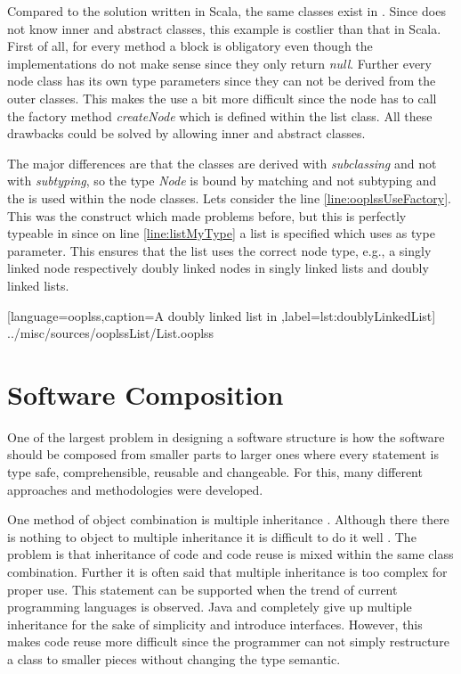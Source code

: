 Compared to the solution written in Scala, the same classes exist
in \ooplss. Since \ooplss does not know inner and abstract classes,
this example is costlier than that in Scala. First of all, for every method 
a block is obligatory even though the implementations do not make sense since
they only return \emph{null}. Further every node class has its own type
parameters since they can not be derived from the outer classes. This
makes the use a bit more difficult since the node has to call the factory
method \emph{createNode} which is defined within the list class. All
these drawbacks could be solved by allowing inner and abstract classes.

The major differences are that the classes are derived with
\emph{subclassing} and not with \emph{subtyping}, so the type
\emph{Node} is bound by matching and not subtyping and the
\mytype is used within the node classes. Lets consider the line
\ref{line:ooplssUseFactory}. This was the construct which made problems
before, but this is perfectly typeable in \ooplss since on
line \ref{line:listMyType} a list is specified which uses \mytype as
type parameter. This ensures that the list uses the correct node type,
e.g., a singly linked node respectively doubly linked nodes in singly
linked lists and doubly linked lists.


[language=ooplss,caption=A doubly linked list in \ooplss,label=lst:doublyLinkedList]
{../misc/sources/ooplssList/List.ooplss}

\section{Software Composition}
One of the largest problem in designing a software structure is how the
software should be composed from smaller parts to larger ones where every
statement is type safe, comprehensible, reusable and changeable. For this,
many different approaches and methodologies were developed.

One method of object combination is multiple inheritance
\cite{taivalsaari_notion_1996}. Although there there is nothing
to object to multiple inheritance it is difficult to do it well
\cite{wegner_panel_1987}. The problem is that inheritance of code
and code reuse is mixed within the same class combination. Further
it is often said that multiple inheritance is too complex for proper use.
This statement can be supported when the trend of current programming languages 
is observed. Java and \cs completely give up multiple inheritance for
the sake of simplicity and introduce interfaces. However, this makes
code reuse more difficult since the programmer can not simply restructure
a class to smaller pieces without changing the type semantic.

